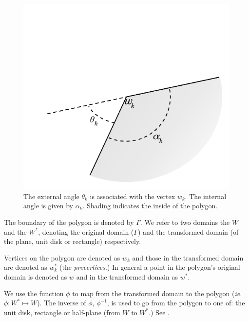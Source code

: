 \begin{figure} [bp]
\centering
\includegraphics[scale=0.6]{sc/figs/anglediagram.pdf}
\caption{The external angle $\theta_k$ is associated with the vertex $w_k$. The internal angle is given by $\alpha_k$. Shading indicates the inside of the polygon.}
\label{anglediagram}
\end{figure}

The boundary of the polygon is denoted by $\Gamma$. We refer to two domains the $W$ and the $W^*$, denoting the original domain ($\Gamma$) and the transformed domain (of the plane, unit disk or rectangle) respectively. 

Vertices on the polygon are denoted as $w_k$ and those in the transformed domain are denoted as $w^*_k$ (the \emph{prevertices}.) In general a point in the polygon's original domain is denoted as $w$ and in the transformed domain as $w^*$.

We use the function $\phi$ to map from the transformed domain to the polygon (\emph{ie.} $\phi:W^* \mapsto W$). The inverse of $\phi$, $\phi^{-1}$, is used to go from the polygon to one of: the unit disk, rectangle or half-plane (from $W$ to $W^*$.)  See .

